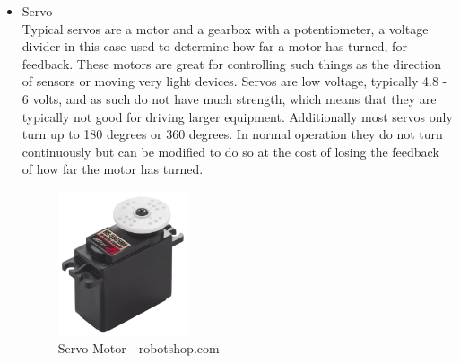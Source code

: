 \begin{itemize}
\item Servo
\\Typical servos are a motor and a gearbox with a potentiometer, a voltage divider in this case used to determine how far a motor has turned, for feedback.  These motors are great for controlling such things as the direction of sensors or moving very light devices.  Servos are low voltage, typically 4.8 - 6 volts, and as such do not have much strength, which means that they are typically not good for driving larger equipment.  Additionally most servos only turn up to 180 degrees or 360 degrees.  In normal operation they do not turn continuously but can be modified to do so at the cost of losing the feedback of how far the motor has turned.
\begin{figure}[h]
\centering
        \includegraphics[width=1.5in] {Images/servo.jpg}
        \caption{Servo Motor - robotshop.com}
        \label{Servo Motor}
\end{figure}


\end{itemize}
